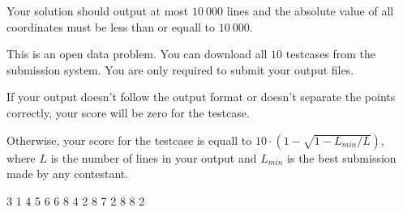 Your solution should output at most $10\ 000$ lines and the absolute value of all coordinates must be less than or equall to $10\ 000$.

This is an open data problem. You can download all $10$ testcases from the submission system. You are only required to submit your output files.

If your output doesn't follow the output format or doesn't separate the points correctly, your score will be zero for the testcase.

Otherwise, your score for the testcase is equall to
$ 10 \cdot \left(1 - \sqrt{1 - L_{min} / L}\right)$,
where $L$ is the number of lines in your output and $L_{min}$ is the best submission made by any contestant.


3 1
4 5
6 6
8 4
 2 8 7
2 8 8 2
\sampleEND


